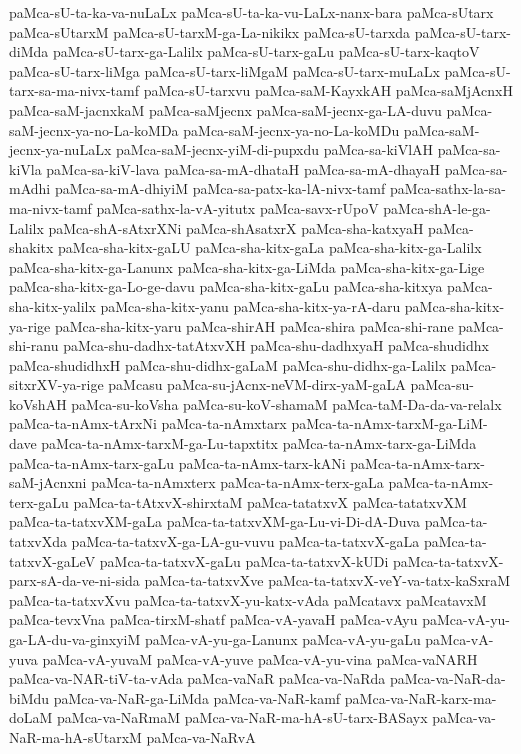 {paMca-sU-ta-ka-va-nuLaLx
paMca-sU-ta-ka-vu-LaLx-nanx-bara
paMca-sUtarx
paMca-sUtarxM
paMca-sU-tarxM-ga-La-nikikx
paMca-sU-tarxda
paMca-sU-tarx-diMda
paMca-sU-tarx-ga-Lalilx
paMca-sU-tarx-gaLu
paMca-sU-tarx-kaqtoV
paMca-sU-tarx-liMga
paMca-sU-tarx-liMgaM
paMca-sU-tarx-muLaLx
paMca-sU-tarx-sa-ma-nivx-tamf
paMca-sU-tarxvu
paMca-saM-KayxkAH
paMca-saMjAcnxH
paMca-saM-jacnxkaM
paMca-saMjecnx
paMca-saM-jecnx-ga-LA-duvu
paMca-saM-jecnx-ya-no-La-koMDa
paMca-saM-jecnx-ya-no-La-koMDu
paMca-saM-jecnx-ya-nuLaLx
paMca-saM-jecnx-yiM-di-pupxdu
paMca-sa-kiVlAH
paMca-sa-kiVla
paMca-sa-kiV-lava
paMca-sa-mA-dhataH
paMca-sa-mA-dhayaH
paMca-sa-mAdhi
paMca-sa-mA-dhiyiM
paMca-sa-patx-ka-lA-nivx-tamf
paMca-sathx-la-sa-ma-nivx-tamf
paMca-sathx-la-vA-yitutx
paMca-savx-rUpoV
paMca-shA-le-ga-Lalilx
paMca-shA-sAtxrXNi
paMca-shAsatxrX
paMca-sha-katxyaH
paMca-shakitx
paMca-sha-kitx-gaLU
paMca-sha-kitx-gaLa
paMca-sha-kitx-ga-Lalilx
paMca-sha-kitx-ga-Lanunx
paMca-sha-kitx-ga-LiMda
paMca-sha-kitx-ga-Lige
paMca-sha-kitx-ga-Lo-ge-davu
paMca-sha-kitx-gaLu
paMca-sha-kitxya
paMca-sha-kitx-yalilx
paMca-sha-kitx-yanu
paMca-sha-kitx-ya-rA-daru
paMca-sha-kitx-ya-rige
paMca-sha-kitx-yaru
paMca-shirAH
paMca-shira
paMca-shi-rane
paMca-shi-ranu
paMca-shu-dadhx-tatAtxvXH
paMca-shu-dadhxyaH
paMca-shudidhx
paMca-shudidhxH
paMca-shu-didhx-gaLaM
paMca-shu-didhx-ga-Lalilx
paMca-sitxrXV-ya-rige
paMcasu
paMca-su-jAcnx-neVM-dirx-yaM-gaLA
paMca-su-koVshAH
paMca-su-koVsha
paMca-su-koV-shamaM
paMca-taM-Da-da-va-relalx
paMca-ta-nAmx-tArxNi
paMca-ta-nAmxtarx
paMca-ta-nAmx-tarxM-ga-LiM-dave
paMca-ta-nAmx-tarxM-ga-Lu-tapxtitx
paMca-ta-nAmx-tarx-ga-LiMda
paMca-ta-nAmx-tarx-gaLu
paMca-ta-nAmx-tarx-kANi
paMca-ta-nAmx-tarx-saM-jAcnxni
paMca-ta-nAmxterx
paMca-ta-nAmx-terx-gaLa
paMca-ta-nAmx-terx-gaLu
paMca-ta-tAtxvX-shirxtaM
paMca-tatatxvX
paMca-tatatxvXM
paMca-ta-tatxvXM-gaLa
paMca-ta-tatxvXM-ga-Lu-vi-Di-dA-Duva
paMca-ta-tatxvXda
paMca-ta-tatxvX-ga-LA-gu-vuvu
paMca-ta-tatxvX-gaLa
paMca-ta-tatxvX-gaLeV
paMca-ta-tatxvX-gaLu
paMca-ta-tatxvX-kUDi
paMca-ta-tatxvX-parx-sA-da-ve-ni-sida
paMca-ta-tatxvXve
paMca-ta-tatxvX-veY-va-tatx-kaSxraM
paMca-ta-tatxvXvu
paMca-ta-tatxvX-yu-katx-vAda
paMcatavx
paMcatavxM
paMca-tevxVna
paMca-tirxM-shatf
paMca-vA-yavaH
paMca-vAyu
paMca-vA-yu-ga-LA-du-va-ginxyiM
paMca-vA-yu-ga-Lanunx
paMca-vA-yu-gaLu
paMca-vA-yuva
paMca-vA-yuvaM
paMca-vA-yuve
paMca-vA-yu-vina
paMca-vaNARH
paMca-va-NAR-tiV-ta-vAda
paMca-vaNaR
paMca-va-NaRda
paMca-va-NaR-da-biMdu
paMca-va-NaR-ga-LiMda
paMca-va-NaR-kamf
paMca-va-NaR-karx-ma-doLaM
paMca-va-NaRmaM
paMca-va-NaR-ma-hA-sU-tarx-BASayx
paMca-va-NaR-ma-hA-sUtarxM
paMca-va-NaRvA
}

